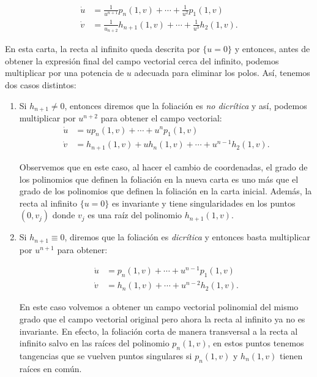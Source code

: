 \begin{equation}
\label{EcuacionEnCP2Infinito}
\begin{aligned}
\dot{u} &=\frac{1}{u^{n+1}}p_{n}(1,v)+\cdots+\frac{1}{u^{2}}p_{1}(1,v)\\
\dot{v} &=\frac{1}{u_{n+2}}h_{n+1}(1,v)+\cdots+\frac{1}{u^{3}}h_{2}(1,v).
\end{aligned}
\end{equation}

En esta carta, la recta al infinito queda descrita por $\{u=0\}$ y entonces, antes de obtener la expresión final del campo vectorial cerca del infinito, podemos multiplicar por una potencia de $u$ adecuada para eliminar los polos. Así, tenemos dos casos distintos:

\begin{enumerate}

\item Si $h_{n+1}\neq 0$, entonces diremos que la foliación es \emph{no dicrítica} y así, podemos multiplicar por $u^{n+2}$ para obtener el campo vectorial:
\begin{equation}
\label{EcuacionNoDicritica}
\begin{aligned}
\dot{u} &=up_{n}(1,v)+\cdots+u^{n}p_{1}(1,v)\\
\dot{v} &=h_{n+1}(1,v)+uh_{n}(1,v)+\cdots+u^{n-1}h_{2}(1,v).
\end{aligned}
\end{equation}

Observemos que en este caso, al hacer el cambio de coordenadas, el grado de los polinomios que definen la foliación en la nueva carta es uno más que el grado de los polinomios que definen la foliación en la carta inicial. Además, la recta al infinito $\{u=0\}$ es invariante y tiene singularidades en los puntos $(0,v_{j})$ donde $v_{j}$ es una raíz del polinomio $h_{n+1}(1,v)$.

\item Si $h_{n+1}\equiv 0$, diremos que la foliación es \emph{dicrítica} y entonces basta multiplicar por $u^{n+1}$ para obtener:

\begin{equation}
\label{EcuacionDicriticaInfinito}
\begin{aligned}
\dot{u} &=p_{n}(1,v)+\cdots+u^{n-1}p_{1}(1,v)\\
\dot{v} &=h_{n}(1,v)+\cdots+u^{n-2}h_{2}(1,v).
\end{aligned}
\end{equation}

En este caso volvemos a obtener un campo vectorial polinomial del mismo grado que el campo vectorial original pero ahora la recta al infinito ya no es invariante. En efecto, la foliación corta de manera transversal a la recta al infinito salvo en las raíces del polinomio $p_{n}(1,v)$, en estos puntos tenemos tangencias que se vuelven puntos singulares si $p_{n}(1,v)$ y $h_{n}(1,v)$ tienen raíces en común.
\end{enumerate}

